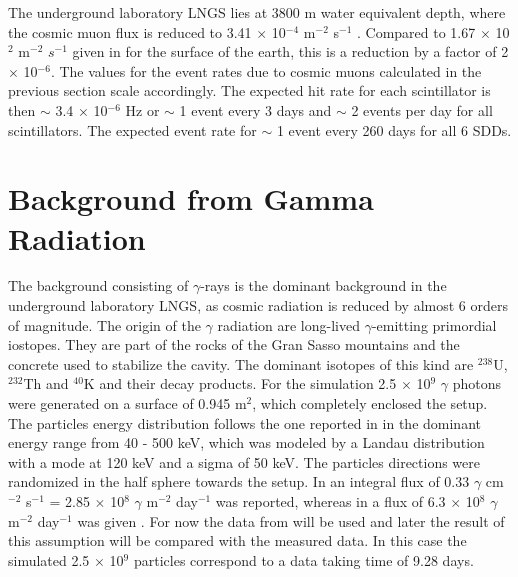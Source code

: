 The underground laboratory LNGS lies at 3800 m water equivalent depth, where the cosmic muon flux is reduced to 3.41 $\times$ 10$^{-4}$ m$^{-2}$ s$^{-1}$ \cite{Bellini2013}. Compared to 1.67 $\times$ 10$^{2}$ m$^{-2}$ $s^{-1}$ given in \cite{Gaisser2000} for the surface of the earth, this is a reduction by a factor of 2 $\times$ 10$^{-6}$. The values for the event rates due to cosmic muons calculated in the previous section scale accordingly. The expected hit rate for each scintillator is then $\sim$ 3.4 $\times$ 10$^{-6}$ Hz or $\sim$ 1 event every 3 days and $\sim$ 2 events per day for all scintillators. The expected event rate for $\sim$ 1 event every 260 days for all 6 SDDs.


\section{Background from Gamma Radiation}
\label{sec:gammaSim}

  The background consisting of $\gamma$-rays  is the dominant background in the underground laboratory LNGS, as cosmic radiation is reduced by almost 6 orders of magnitude. The origin of the $\gamma$ radiation are long-lived $\gamma$-emitting primordial iostopes. They are part of the rocks of the Gran Sasso mountains and the concrete used to stabilize the cavity. The dominant isotopes of this kind are $^{238}$U, $^{232}$Th and $^{40}$K \cite{Haffke2011} and their decay products. For the simulation 2.5 $\times$ 10$^{9}$ $\gamma$ photons were generated on a surface of 0.945 m$^{2}$, which completely enclosed the setup. The particles energy distribution follows the one reported in \cite{Haffke2011} in the dominant energy range from 40 - 500 keV, which was modeled by a Landau distribution with a mode at 120 keV and a sigma of 50 keV. The particles directions were randomized in the half sphere towards the setup. In \cite{Haffke2011} an integral flux of 0.33 $\gamma$ cm$^{-2}$ s$^{-1}$ = 2.85 $\times$ 10$^{8}$ $\gamma$ m$^{-2}$ day$^{-1}$ was reported, whereas in \cite{Bucci2009} a flux of 6.3 $\times$ 10$^{8}$ $\gamma$ m$^{-2}$ day$^{-1}$ was given . For now the data from \cite{Haffke2011} will be used and later the result of this assumption will be compared with the measured data. In this case the simulated 2.5 $\times$ 10$^{9}$ particles correspond to a data taking time of 9.28 days.

